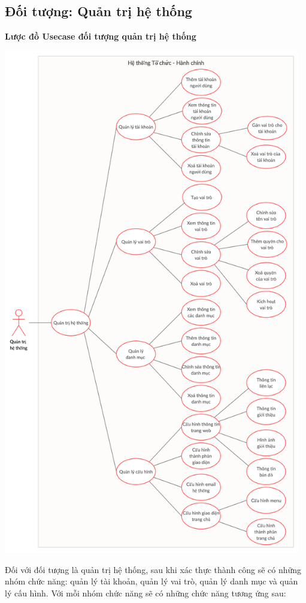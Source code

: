 \subsection{Đối tượng: Quản trị hệ thống}
\textbf{Lược đồ Usecase đối tượng quản trị hệ thống}
\begin{center}
  \captionsetup{type=figure}
  \includegraphics[width=13cm]{img/usecase/admin.png}
\end{center}

\indent Đối với đối tượng là quản trị hệ thống, sau khi xác thực thành công sẽ có những nhóm chức năng: quản lý tài khoản, quản lý vai trò, quản lý danh mục và quản lý cấu hình. Với mỗi nhóm chức năng sẽ có những chức năng tương ứng sau:


